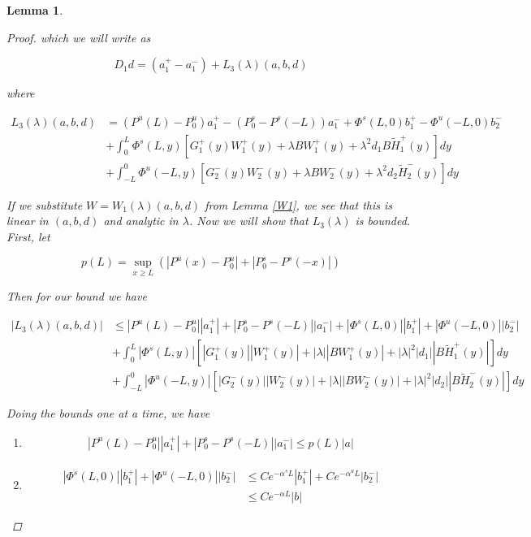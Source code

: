 \documentclass[12pt]{article}
\newtheorem{lemma}{Lemma}
\begin{document}
\begin{lemma}
\begin{proof}
which we will write as

\begin{equation}
D_1 d = (a^+_1 - a^-_1) + L_3(\lambda)(a,b,d)
\end{equation}

where 

\begin{align*}
L_3(\lambda)(a,b,d) &= (P^u(L) - P_0^u) a^+_1 - (P_0^s - P^s(-L)) a^-_1 + \Phi^s(L, 0)b_1^+ - \Phi^u(-L, 0)b_2^- \\
&+ \int_0^L \Phi^s(L, y)[G_1^+(y) W_1^+(y) + \lambda B W_1^+(y) + \lambda^2 d_1 B \tilde{H}_1^+(y) ] dy \\
&+ \int_{-L}^0 \Phi^u(-L, y)[G_2^-(y) W_2^-(y) + \lambda B W_2^-(y) + \lambda^2 d_2 \tilde{H}_2^-(y) ] dy 
\end{align*}

If we substitute $W = W_1(\lambda)(a,b,d)$ from Lemma \ref{W1}, we see that this is linear in $(a,b,d)$ and analytic in $\lambda$. Now we will show that $L_3(\lambda)$ is bounded. First, let

\[
p(L) = \sup_{x \geq L} (|P^u(x) - P_0^u| + |P_0^s - P^s(-x)|)
\]

Then for our bound we have

\begin{align*}
|L_3(\lambda)(a,b,d)| &\leq |P^u(L) - P_0^u|| a^+_1| + |P_0^s - P^s(-L)||a^-_1| + |\Phi^s(L, 0)||b_1^+| + |\Phi^u(-L, 0)||b_2^-| \\
&+ \int_0^L |\Phi^s(L, y)|[|G_1^+(y)||W_1^+(y)| + |\lambda| |B W_1^+(y)| + |\lambda|^2 |d_1| |B \tilde{H}_1^+(y)| ] dy \\
&+ \int_{-L}^0 |\Phi^u(-L, y)|[|G_2^-(y)||W_2^-(y)| + |\lambda| |B W_2^-(y)| + |\lambda|^2 |d_2| |B \tilde{H}_2^-(y)| ] dy 
\end{align*}

Doing the bounds one at a time, we have

\begin{enumerate}

\item
\begin{align*}
|P^u(L) - P_0^u|| a^+_1| + |P_0^s - P^s(-L)||a^-_1| \leq p(L)|a|
\end{align*}

\item
\begin{align*}
|\Phi^s(L, 0)||b_1^+| + |\Phi^u(-L, 0)||b_2^-| &\leq C e^{-\alpha^s L} |b_1^+| + C e^{-\alpha^u L}|b_2^-| \\
&\leq C e^{-\alpha L}|b|
\end{align*}


\end{enumerate}
\end{proof}
\end{lemma}
\end{document}
